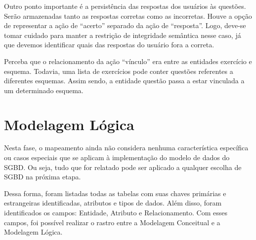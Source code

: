 \documentclass[graduacao,brazil]{ThesisPUC}
\begin{document}
Outro ponto importante \'{e} a persist\^{e}ncia das respostas dos usu\'{a}rios \`{a}s quest\~{o}es. Ser\~{a}o
armazenadas tanto as respostas corretas como as incorretas. Houve a op\c{c}\~{a}o de representar a
a\c{c}\~{a}o de “acerto” separado da a\c{c}\~{a}o de “resposta”. Logo, deve-se tomar cuidado para manter a
restri\c{c}\~{a}o de integridade sem\^{a}ntica nesse caso, j\'{a} que devemos identificar quais das respostas do
usu\'{a}rio fora a correta.

Perceba que o relacionamento da a\c{c}\~{a}o “v\'{i}nculo” era entre as entidades exerc\'{i}cio e
esquema. Todavia, uma lista de exerc\'{i}cios pode conter quest\~{o}es referentes a diferentes
esquemas. Assim sendo, a entidade quest\~{a}o passa a estar vinculada a um determinado esquema.

\section{Modelagem L\'{o}gica}

Nesta fase, o mapeamento ainda n\~{a}o considera nenhuma caracter\'{i}stica espec\'{i}fica ou
casos especiais que se aplicam \`{a} implementa\c{c}\~{a}o do modelo de dados do SGBD. Ou seja, tudo
que for relatado pode ser aplicado a qualquer escolha de SGBD na pr\'{o}xima etapa.

Dessa forma, foram listadas todas as tabelas com suas chaves prim\'{a}rias e estrangeiras
identificadas, atributos e tipos de dados. Al\'{e}m disso, foram identificados os campos: Entidade,
Atributo e Relacionamento. Com esses campos, foi poss\'{i}vel realizar o rastro entre a Modelagem
Conceitual e a Modelagem L\'{o}gica.

\end{document}
